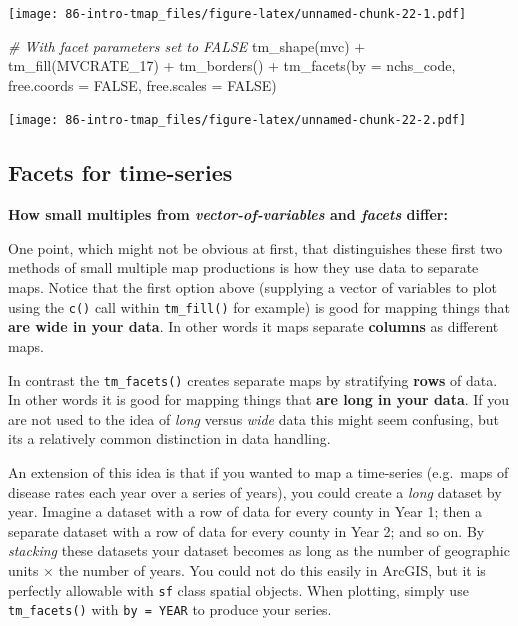\documentclass[
]{book}
\newenvironment{Shaded}{\begin{snugshade}}{\end{snugshade}}
\newcommand{\AttributeTok}[1]{\textcolor[rgb]{0.77,0.63,0.00}{#1}}
\newcommand{\CommentTok}[1]{\textcolor[rgb]{0.56,0.35,0.01}{\textit{#1}}}
\newcommand{\ConstantTok}[1]{\textcolor[rgb]{0.00,0.00,0.00}{#1}}
\newcommand{\FunctionTok}[1]{\textcolor[rgb]{0.00,0.00,0.00}{#1}}
\newcommand{\NormalTok}[1]{#1}
\newcommand{\SpecialCharTok}[1]{\textcolor[rgb]{0.00,0.00,0.00}{#1}}
\newcommand{\StringTok}[1]{\textcolor[rgb]{0.31,0.60,0.02}{#1}}
\begin{document}
\texttt{[image: 86-intro-tmap\_files/figure-latex/unnamed-chunk-22-1.pdf]}

\begin{Shaded}
\begin{Highlighting}[]
\CommentTok{\# With facet parameters set to FALSE}
\FunctionTok{tm\_shape}\NormalTok{(mvc) }\SpecialCharTok{+}
  \FunctionTok{tm\_fill}\NormalTok{(}\StringTok{\textquotesingle{}MVCRATE\_17\textquotesingle{}}\NormalTok{) }\SpecialCharTok{+}
  \FunctionTok{tm\_borders}\NormalTok{() }\SpecialCharTok{+}
  \FunctionTok{tm\_facets}\NormalTok{(}\AttributeTok{by =} \StringTok{\textquotesingle{}nchs\_code\textquotesingle{}}\NormalTok{, }\AttributeTok{free.coords =} \ConstantTok{FALSE}\NormalTok{, }\AttributeTok{free.scales =} \ConstantTok{FALSE}\NormalTok{)}
\end{Highlighting}
\end{Shaded}

\texttt{[image: 86-intro-tmap\_files/figure-latex/unnamed-chunk-22-2.pdf]}

\hypertarget{facets-for-time-series}{%
\subsection{Facets for time-series}\label{facets-for-time-series}}

\textbf{How small multiples from \emph{vector-of-variables} and \emph{facets} differ:}

One point, which might not be obvious at first, that distinguishes these first two methods of small multiple map productions is how they use data to separate maps. Notice that the first option above (supplying a vector of variables to plot using the \texttt{c()} call within \texttt{tm\_fill()} for example) is good for mapping things that \textbf{are wide in your data}. In other words it maps separate \textbf{columns} as different maps.

In contrast the \texttt{tm\_facets()} creates separate maps by stratifying \textbf{rows} of data. In other words it is good for mapping things that \textbf{are long in your data}. If you are not used to the idea of \emph{long} versus \emph{wide} data this might seem confusing, but its a relatively common distinction in data handling.

An extension of this idea is that if you wanted to map a time-series (e.g.~maps of disease rates each year over a series of years), you could create a \emph{long} dataset by year. Imagine a dataset with a row of data for every county in Year 1; then a separate dataset with a row of data for every county in Year 2; and so on. By \emph{stacking} these datasets your dataset becomes as long as the number of geographic units \(\times\) the number of years. You could not do this easily in ArcGIS, but it is perfectly allowable with \texttt{sf} class spatial objects. When plotting, simply use \texttt{tm\_facets()} with \texttt{by\ =\ YEAR} to produce your series.
\end{document}

